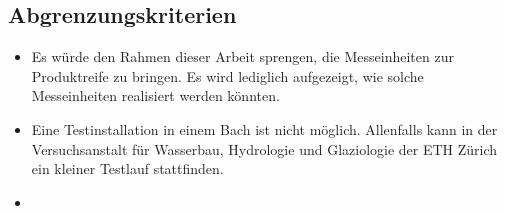 \subsection{Abgrenzungskriterien}
\begin{itemize}
\item Es würde den Rahmen dieser Arbeit sprengen, die Messeinheiten zur Produktreife zu bringen. Es wird lediglich aufgezeigt, wie solche Messeinheiten realisiert werden könnten.
\item Eine Testinstallation in einem Bach ist nicht möglich. Allenfalls kann in der Versuchsanstalt für Wasserbau, Hydrologie und Glaziologie der ETH Zürich ein kleiner Testlauf stattfinden.
\item
\end{itemize}

